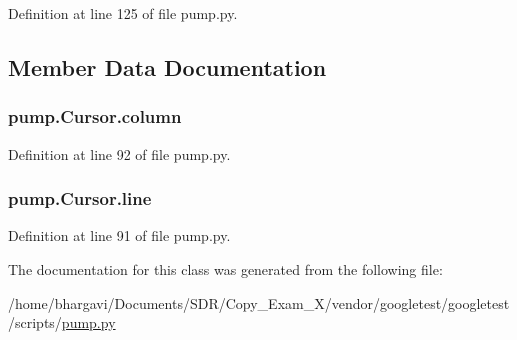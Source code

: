 Definition at line 125 of file pump.\+py.



\subsection{Member Data Documentation}
\subsubsection[{\texorpdfstring{column}{column}}]{\setlength{\rightskip}{0pt plus 5cm}pump.\+Cursor.\+column}\hypertarget{classpump_1_1_cursor_ae73db76c3a845a82afb334633864254e}{}\label{classpump_1_1_cursor_ae73db76c3a845a82afb334633864254e}


Definition at line 92 of file pump.\+py.

\subsubsection[{\texorpdfstring{line}{line}}]{\setlength{\rightskip}{0pt plus 5cm}pump.\+Cursor.\+line}\hypertarget{classpump_1_1_cursor_aee8d8b67360da7fc4e635540cb41d48c}{}\label{classpump_1_1_cursor_aee8d8b67360da7fc4e635540cb41d48c}


Definition at line 91 of file pump.\+py.



The documentation for this class was generated from the following file\+:\begin{DoxyCompactItemize}
\item 
/home/bhargavi/\+Documents/\+S\+D\+R/\+Copy\+\_\+\+Exam\+\_\+X/vendor/googletest/googletest/scripts/\hyperlink{pump_8py}{pump.\+py}\end{DoxyCompactItemize}
